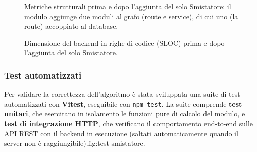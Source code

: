 \begin{figure}[H]
    \centering
    \caption{Metriche strutturali prima e dopo l'aggiunta del solo Smistatore: il
    modulo aggiunge due moduli al grafo (route e service), di cui uno (la route)
    accoppiato al database.}
    \label{fig:strutt-smistatore}
\end{figure}

\begin{figure}[H]
    \centering
    \caption{Dimensione del backend in righe di codice (SLOC) prima e dopo
    l'aggiunta del solo Smistatore.}
    \label{fig:sloc-smistatore}
\end{figure}

\subsubsection{Test automatizzati}

Per validare la correttezza dell'algoritmo è stata sviluppata una suite di test
automatizzati con \textbf{Vitest}, eseguibile con \texttt{npm test}. La suite
comprende \textbf{test unitari}, che esercitano in isolamento le funzioni pure di
calcolo del modulo, e \textbf{test di integrazione HTTP}, che verificano il
comportamento end-to-end sulle API REST con il backend in esecuzione (saltati
automaticamente quando il server non è raggiungibile).{fig:test-smistatore}.

